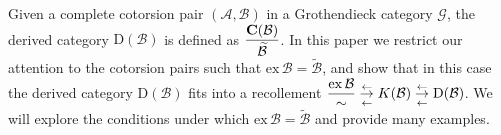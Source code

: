 
Given a complete cotorsion pair $(\mathcal{A},\mathcal{B})$ in a Grothendieck category $\mathcal{G}$,
the derived category $\mathrm{D}(\mathcal{B})$ is defined as $\dfrac{\mathbf{C}(\mathcal{B})}{\widetilde{\mathcal{B}}}$.
In this paper we restrict our attention to the cotorsion pairs such that
$\mathrm{ex}\,\mathcal{B}=\widetilde{\mathcal{B}}$, and show that in this case the derived category $\mathrm{D}(\mathcal{B})$
fits into a recollement
$\displaystyle\frac{\mathrm{ex}\,\mathcal{B}}{\sim} \underset{\leftarrow}{\overset{\leftarrow}\to} K(\mathcal{B}) \underset{\leftarrow}{\overset{\leftarrow}\to} \mathrm{D}(\mathcal{B})$.
We will explore the conditions under which $\mathrm{ex}\,\mathcal{B}=\widetilde{\mathcal{B}}$ and provide many examples.
